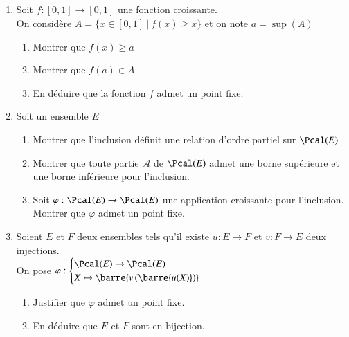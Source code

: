 \documentclass[oneside,12pt]{article}
\begin{document}
\subsection{}
\begin{enumerate}
	\item Soit $f:[0,1]\to[0,1]$ une fonction croissante. \\
	On considère $A=\{x\in[0,1] ~|~ f(x)\geq x\}$ et on note $a=\sup(A)$
	\begin{enumerate}
		\item Montrer que $f(x)\geq a$
		\item Montrer que $f(a)\in A$
		\item En déduire que la fonction $f$ admet un point fixe.
	\end{enumerate}
	\item Soit un ensemble $E$
	\begin{enumerate}
		\item Montrer que l'inclusion définit une relation d'ordre partiel sur $\Pcal(E)$
		\item Montrer que toute partie $\mathcal{A}$ de $\Pcal(E)$ admet une borne supérieure et une borne inférieure pour l'inclusion.
		\item Soit $\varphi : \Pcal(E) \to \Pcal(E)$ une application croissante pour l'inclusion. \\
		Montrer que $\varphi$ admet un point fixe.
	\end{enumerate}
	\item Soient $E$ et $F$ deux ensembles tels qu'il existe $u:E\to F$ et $v:F \to E$ deux injections. \\
	On pose $\varphi:\begin{cases}\Pcal(E)\to\Pcal(E) \\ X \mapsto \barre{v\left(\barre{u(X)}\right)} \end{cases}$ 
	\begin{enumerate}
		\item Justifier que $\varphi$ admet un point fixe.
		\item En déduire que $E$ et $F$ sont en bijection.
	\end{enumerate}
\end{enumerate}
\end{document}
